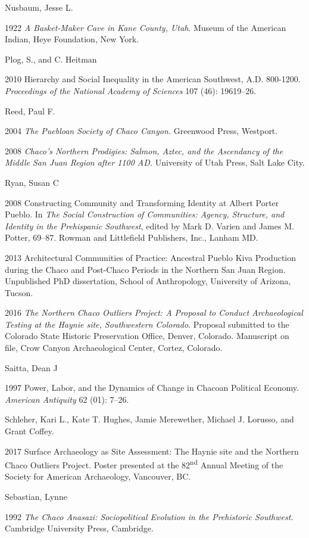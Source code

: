 \documentclass[
  12pt,
]{krantz}
\begin{document}
Nusbaum, Jesse L.

1922 \emph{A Basket-Maker Cave in Kane County, Utah}. Museum of the American
Indian, Heye Foundation, New York.

Plog, S., and C. Heitman

2010 Hierarchy and Social Inequality in the American Southwest, A.D.
800-1200. \emph{Proceedings of the National Academy of Sciences} 107 (46):
19619--26.

Reed, Paul F.

2004 \emph{The Puebloan Society of Chaco Canyon.} Greenwood Press, Westport.

2008 \emph{Chaco's Northern Prodigies: Salmon, Aztec, and the Ascendancy of
the Middle San Juan Region after 1100 AD.} University of Utah Press,
Salt Lake City.

Ryan, Susan C

2008 Constructing Community and Transforming Identity at Albert Porter
Pueblo. In \emph{The Social Construction of Communities: Agency, Structure,
and Identity in the Prehispanic Southwest}, edited by Mark D. Varien and
James M. Potter, 69--87. Rowman and Littlefield Publishers, Inc., Lanham
MD.

2013 Architectural Communities of Practice: Ancestral Pueblo Kiva
Production during the Chaco and Post-Chaco Periods in the Northern San
Juan Region. Unpublished PhD dissertation, School of Anthropology,
University of Arizona, Tucson.

2016 \emph{The Northern Chaco Outliers Project: A Proposal to Conduct
Archaeological Testing at the Haynie site, Southwestern Colorado}.
Proposal submitted to the Colorado State Historic Preservation Office,
Denver, Colorado. Manuscript on file, Crow Canyon Archaeological Center,
Cortez, Colorado.

Saitta, Dean J

1997 Power, Labor, and the Dynamics of Change in Chacoan Political
Economy. \emph{American Antiquity} 62 (01): 7--26.

Schleher, Kari L., Kate T. Hughes, Jamie Merewether, Michael J. Lorusso,
and Grant Coffey.

2017 Surface Archaeology as Site Assessment: The Haynie site and the
Northern Chaco Outliers Project. Poster presented at the 82\textsuperscript{nd} Annual
Meeting of the Society for American Archaeology, Vancouver, BC.

Sebastian, Lynne

1992 \emph{The Chaco Anasazi: Sociopolitical Evolution in the Prehistoric
Southwest}. Cambridge University Press, Cambridge.
\end{document}
